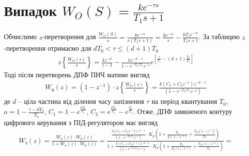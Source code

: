 \section{Випадок \texorpdfstring{$W_O(S) = \frac{k e^{-\tau s}}{T_1 s + 1}$}{3}}
Обчислимо $z$-перетворення для $\frac{W_O(S)}{s} = \frac{k e^{-\tau s}}{s(T_1 s + 1)} = 
\frac{k e^{-\tau s}}{s} - \frac{k T_1 e^{-\tau s}}{T_1 s + 1}$.
За таблицею $z$-перетворення отримаємо для $d T_0 < \tau \leq (d+1)T_0$
\begin{gather}
    z\left\{\frac{W_O(s)}{s} \right\} = \frac{k z^{-d}}{z - 1} - 
    \frac{k z^{-d-1}}{1 - e^{-T_0/ T_1} z^{-1}} 
    e^{\left[
        \frac{\tau}{T_1} - (d+1) \frac{T_0}{T_1}
     \right]}
\end{gather}
Тоді після перетворень ДПФ ПНЧ матиме вигляд
\begin{gather}
    W_{\text{п}}(z) = \left(1 - z^{-1}\right) \cdot z\left\{\frac{W_O(s)}{s} \right\} = 
    \frac{
        k \left(C_1 + C_2 z^{-1}\right) z^{-d-1}
    }{
        \left(1 - e^{-T_0 / T_1} z^{-1}\right)
    }
\end{gather}
де $d$ -- ціла частина від ділення часу запізнення $\tau$ на період квантування
$T_0$, $a = 1 - \frac{\tau - d T_0}{T_0}$, $C_1 = 1 - e^{\frac{a T_0}{T_1}}$,
$C_2 = e^{\frac{a T_0}{T_1}} - e^{\frac{T_0}{T_1}}$.
Отже, ДПФ замкненого контуру цифрового керування з ПІД-регулятором має вигляд
\begin{gather*}
    W_{\text{з}}(z) = \frac{
        W_{\text{п}} (z) \cdot W_p(z)
    }{1 + W_{\text{п}} (z) \cdot W_p(z)} =
    \frac{
        \frac{
            k \left(C_1 + C_2 z^{-1}\right) z^{-d-1}
        }{
            \left(1 - e^{-T_0 / T_1} z^{-1}\right)
        } \cdot K_p \left(
            1 + \frac{T_0}{T_I \left(1 - z^{-1}\right)} + \frac{T_D\left(1 - z^{-1}\right)}{T_0}
        \right)
    }{
        1 + \frac{
            k \left(C_1 + C_2 z^{-1}\right) z^{-d-1}
        }{
            \left(1 - e^{-T_0 / T_1} z^{-1}\right)
        } \cdot K_p \left(
            1 + \frac{T_0}{T_I \left(1 - z^{-1}\right)} + \frac{T_D\left(1 - z^{-1}\right)}{T_0}
        \right)
    } =
\end{gather*}

